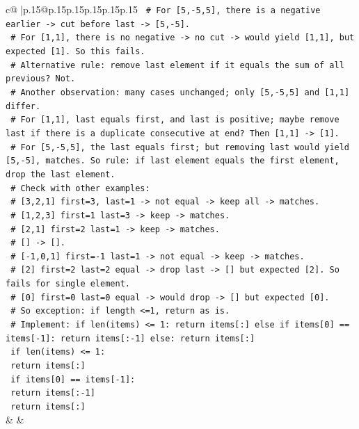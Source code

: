 \documentclass{article}
\begin{document}
{\begin{supertabular}{c@{$\;$}|p{.15\linewidth}@{}p{.15\linewidth}p{.15\linewidth}p{.15\linewidth}p{.15\linewidth}p{.15\linewidth}}
{{{\texttt{    \# For {[}5,{-}5,5{]}, there is a negative earlier {-}> cut before last {-}> {[}5,{-}5{]}.} \\
\texttt{    \# For {[}1,1{]}, there is no negative {-}> no cut {-}> would yield {[}1,1{]}, but expected {[}1{]}. So this fails.} \\
\texttt{    \# Alternative rule: remove last element if it equals the sum of all previous? Not.} \\
\texttt{    \# Another observation: many cases unchanged; only {[}5,{-}5,5{]} and {[}1,1{]} differ.} \\
\texttt{    \# For {[}1,1{]}, last equals first, and last is positive; maybe remove last if there is a duplicate consecutive at end? Then {[}1,1{]} {-}> {[}1{]}.} \\
\texttt{    \# For {[}5,{-}5,5{]}, the last equals first; but removing last would yield {[}5,{-}5{]}, matches. So rule: if last element equals the first element, drop the last element.} \\
\texttt{    \# Check with other examples:} \\
\texttt{    \# {[}3,2,1{]} first=3, last=1 {-}> not equal {-}> keep all {-}> matches.} \\
\texttt{    \# {[}1,2,3{]} first=1 last=3 {-}> keep {-}> matches.} \\
\texttt{    \# {[}2,1{]} first=2 last=1 {-}> keep {-}> matches.} \\
\texttt{    \# {[}{]} {-}> {[}{]}.} \\
\texttt{    \# {[}{-}1,0,1{]} first={-}1 last=1 {-}> not equal {-}> keep {-}> matches.} \\
\texttt{    \# {[}2{]} first=2 last=2 equal {-}> drop last {-}> {[}{]} but expected {[}2{]}. So fails for single element.} \\
\texttt{    \# {[}0{]} first=0 last=0 equal {-}> would drop {-}> {[}{]} but expected {[}0{]}.} \\
\texttt{    \# So exception: if length <=1, return as is.} \\
\texttt{    \# Implement: if len(items) <= 1: return items{[}:{]} else if items{[}0{]} == items{[}{-}1{]}: return items{[}:{-}1{]} else: return items{[}:{]}} \\
\texttt{    if len(items) <= 1:} \\
\texttt{        return items{[}:{]}} \\
\texttt{    if items{[}0{]} == items{[}{-}1{]}:} \\
\texttt{        return items{[}:{-}1{]}} \\
\texttt{    return items{[}:{]}} \\
            }
        }
    }
    & & \\ \\


\end{supertabular}}
\end{document}
